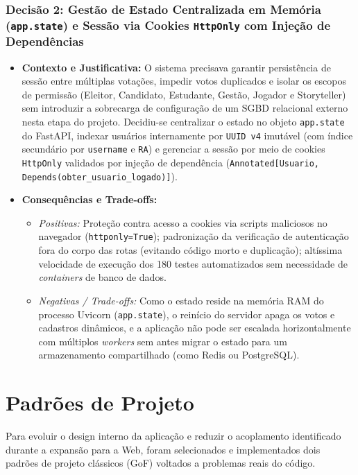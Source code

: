 \documentclass[12pt,a4paper]{article}
\begin{document}
\subsubsection*{Decisão 2: Gestão de Estado Centralizada em Memória (\texttt{app.state}) e Sessão via Cookies \texttt{HttpOnly} com Injeção de Dependências}
\begin{itemize}
    \item \textbf{Contexto e Justificativa:} O sistema precisava garantir persistência de sessão entre múltiplas votações, impedir votos duplicados e isolar os escopos de permissão (Eleitor, Candidato, Estudante, Gestão, Jogador e Storyteller) sem introduzir a sobrecarga de configuração de um SGBD relacional externo nesta etapa do projeto. Decidiu-se centralizar o estado no objeto \texttt{app.state} do FastAPI, indexar usuários internamente por \texttt{UUID v4} imutável (com índice secundário por \texttt{username} e \texttt{RA}) e gerenciar a sessão por meio de cookies \texttt{HttpOnly} validados por injeção de dependência (\texttt{Annotated[Usuario, Depends(obter\_usuario\_logado)]}).
    \item \textbf{Consequências e Trade-offs:}
    \begin{itemize}
        \item \textit{Positivas:} Proteção contra acesso a cookies via scripts maliciosos no navegador (\texttt{httponly=True}); padronização da verificação de autenticação fora do corpo das rotas (evitando código morto e duplicação); altíssima velocidade de execução dos 180 testes automatizados sem necessidade de \textit{containers} de banco de dados.
        \item \textit{Negativas / Trade-offs:} Como o estado reside na memória RAM do processo Uvicorn (\texttt{app.state}), o reinício do servidor apaga os votos e cadastros dinâmicos, e a aplicação não pode ser escalada horizontalmente com múltiplos \textit{workers} sem antes migrar o estado para um armazenamento compartilhado (como Redis ou PostgreSQL).
    \end{itemize}
\end{itemize}


\section{Padrões de Projeto}

Para evoluir o design interno da aplicação e reduzir o acoplamento identificado durante a expansão para a Web, foram selecionados e implementados dois padrões de projeto clássicos (GoF) voltados a problemas reais do código.
\end{document}

